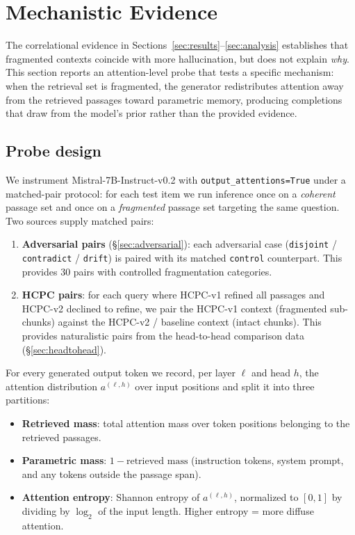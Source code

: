 \section{Mechanistic Evidence}
\label{sec:mechanistic}

The correlational evidence in Sections~\ref{sec:results}--\ref{sec:analysis}
establishes that fragmented contexts coincide with more hallucination, but
does not explain \emph{why}. This section reports an attention-level probe
that tests a specific mechanism: when the retrieval set is fragmented, the
generator redistributes attention away from the retrieved passages toward
parametric memory, producing completions that draw from the model's prior
rather than the provided evidence.

\subsection{Probe design}

We instrument Mistral-7B-Instruct-v0.2 with
\texttt{output\_attentions=True} under a matched-pair protocol: for each
test item we run inference once on a \emph{coherent} passage set and once
on a \emph{fragmented} passage set targeting the same question. Two
sources supply matched pairs:

\begin{enumerate}
  \item \textbf{Adversarial pairs} (§\ref{sec:adversarial}): each
        adversarial case (\texttt{disjoint} / \texttt{contradict} /
        \texttt{drift}) is paired with its matched \texttt{control}
        counterpart. This provides 30 pairs with controlled fragmentation
        categories.
  \item \textbf{HCPC pairs}: for each query where HCPC-v1 refined all
        passages and HCPC-v2 declined to refine, we pair the HCPC-v1
        context (fragmented sub-chunks) against the HCPC-v2 / baseline
        context (intact chunks). This provides naturalistic pairs from
        the head-to-head comparison data (§\ref{sec:headtohead}).
\end{enumerate}

For every generated output token we record, per layer $\ell$ and head
$h$, the attention distribution $a^{(\ell,h)}$ over input positions and
split it into three partitions:

\begin{itemize}
  \item \textbf{Retrieved mass}: total attention mass over token positions
        belonging to the retrieved passages.
  \item \textbf{Parametric mass}: $1 - \text{retrieved mass}$ (instruction
        tokens, system prompt, and any tokens outside the passage span).
  \item \textbf{Attention entropy}: Shannon entropy of $a^{(\ell,h)}$,
        normalized to $[0, 1]$ by dividing by $\log_2$ of the input
        length. Higher entropy = more diffuse attention.
\end{itemize}

